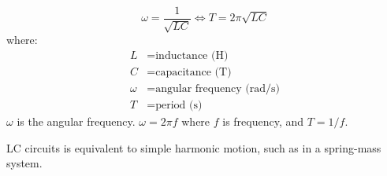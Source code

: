 \documentclass{article}
\newcommand{\theorem}[2]{\begin{tcolorbox}[title={#1},colback=blue!5!white,colframe=blue!75!black,parbox=false] #2 \end{tcolorbox}}
\begin{document}
\theorem{Period of LC circuit}{
	\begin{equation*}
	    \omega=\frac{1}{\sqrt{LC}}
		\iff T=2\pi \sqrt{LC}
	\end{equation*}
	where:
	\begin{align*}
		L&=\text{inductance (H)} \\
		C&=\text{capacitance (T)} \\
		\omega&=\text{angular frequency (rad/s)} \\
		T&=\text{period (s)}
	\end{align*}
	$\omega$ is the angular frequency. $\omega=2\pi f$ where $f$ is frequency, and $T=1/f$.
}

LC circuits is equivalent to simple harmonic motion, such as in a spring-mass system.
\end{document}
